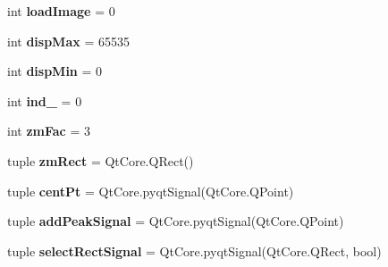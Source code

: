 \begin{DoxyCompactItemize}
\item 
\hypertarget{classmyImDisplay_1_1myImDisplay_aeaa8491db62f6e99ba83f6fa81dc6d74}{int {\bfseries load\-Image} = 0}\label{classmyImDisplay_1_1myImDisplay_aeaa8491db62f6e99ba83f6fa81dc6d74}

\item 
\hypertarget{classmyImDisplay_1_1myImDisplay_aaff409ee4de877ac2f0fcb090e1a5daf}{int {\bfseries disp\-Max} = 65535}\label{classmyImDisplay_1_1myImDisplay_aaff409ee4de877ac2f0fcb090e1a5daf}

\item 
\hypertarget{classmyImDisplay_1_1myImDisplay_a795083e40d9aa9b6e7d4a5d37910e187}{int {\bfseries disp\-Min} = 0}\label{classmyImDisplay_1_1myImDisplay_a795083e40d9aa9b6e7d4a5d37910e187}

\item 
\hypertarget{classmyImDisplay_1_1myImDisplay_a4c5cc84a1c8d090c4c43d8f78b7b4d9f}{int {\bfseries ind\-\_} = 0}\label{classmyImDisplay_1_1myImDisplay_a4c5cc84a1c8d090c4c43d8f78b7b4d9f}

\item 
\hypertarget{classmyImDisplay_1_1myImDisplay_a34f600eea208832c0b785288ccad9fc7}{int {\bfseries zm\-Fac} = 3}\label{classmyImDisplay_1_1myImDisplay_a34f600eea208832c0b785288ccad9fc7}

\item 
\hypertarget{classmyImDisplay_1_1myImDisplay_a02f7742e2c4e540f6585f39c8af717cb}{tuple {\bfseries zm\-Rect} = Qt\-Core.\-Q\-Rect()}\label{classmyImDisplay_1_1myImDisplay_a02f7742e2c4e540f6585f39c8af717cb}

\item 
\hypertarget{classmyImDisplay_1_1myImDisplay_afe92f10aebabc4ab5d3f18a6fea84d75}{tuple {\bfseries cent\-Pt} = Qt\-Core.\-pyqt\-Signal(Qt\-Core.\-Q\-Point)}\label{classmyImDisplay_1_1myImDisplay_afe92f10aebabc4ab5d3f18a6fea84d75}

\item 
\hypertarget{classmyImDisplay_1_1myImDisplay_a52347d8a98f02a25ddc2929a08461909}{tuple {\bfseries add\-Peak\-Signal} = Qt\-Core.\-pyqt\-Signal(Qt\-Core.\-Q\-Point)}\label{classmyImDisplay_1_1myImDisplay_a52347d8a98f02a25ddc2929a08461909}

\item 
\hypertarget{classmyImDisplay_1_1myImDisplay_a9e0436ef995b6fa9769ab1cc004956e4}{tuple {\bfseries select\-Rect\-Signal} = Qt\-Core.\-pyqt\-Signal(Qt\-Core.\-Q\-Rect, bool)}\label{classmyImDisplay_1_1myImDisplay_a9e0436ef995b6fa9769ab1cc004956e4}


\end{DoxyCompactItemize}
